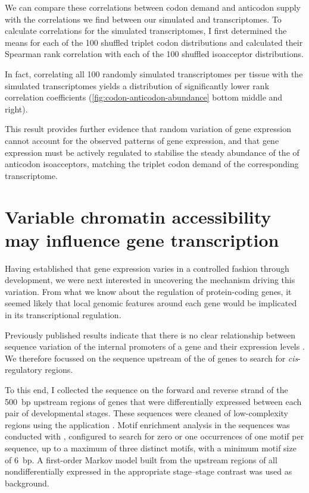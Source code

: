 We can compare these correlations between \mrna codon demand and \trna anticodon
supply with the correlations we find between our simulated \mrna and \trna
transcriptomes. To calculate correlations for the simulated transcriptomes, I
first determined the means for each of the \num{100} shuffled triplet codon
distributions and calculated their Spearman rank correlation with each of the
\num{100} shuffled isoacceptor distributions.

In fact, correlating all \num{100} randomly simulated \trna
transcriptomes per tissue with the simulated \mrna transcriptomes yields a
distribution of significantly lower rank correlation coefficients
(\cref{fig:codon-anticodon-abundance} bottom middle and right).

This result provides further evidence that random variation of \trna gene
expression cannot account for the observed patterns of \trna gene expression,
and that \trna gene expression must be actively regulated to stabilise the
steady abundance of the of \trna anticodon isoacceptors, matching the triplet
codon demand of the corresponding \mrna transcriptome.

\section{Variable chromatin accessibility may influence  gene
transcription}

Having established that \trna gene expression varies in a controlled fashion
through development, we were next interested in uncovering the mechanism driving
this variation. From what we know about the regulation of protein-coding genes,
it seemed likely that local genomic features around each \trna gene would be
implicated in its transcriptional regulation.

Previously published results indicate that there is no clear relationship
between sequence variation of the internal promoters of a \trna gene and their
expression levels \citep{Oler:2010,Canella:2012}. We therefore focussed on the
sequence upstream of the \tss of \trna genes to search for \emph{cis}-regulatory
regions.

To this end, I collected the sequence on the forward and reverse strand of the
\SI{500}{bp} upstream regions of \trna genes that were differentially expressed
between each pair of developmental stages. These sequences were cleaned of
low-complexity regions using the  application \citep{Bailey:2009}.
Motif enrichment analysis in the sequences was conducted with 
\citep{Bailey:2009}, configured to search for zero or one occurrences of one
motif per sequence, up to a maximum of three distinct motifs, with a minimum
motif size of \SI{6}{bp}. A first-order Markov model built from the upstream
regions of all nondifferentially expressed \trna[s] in the appropriate
stage–stage contrast was used as background.

